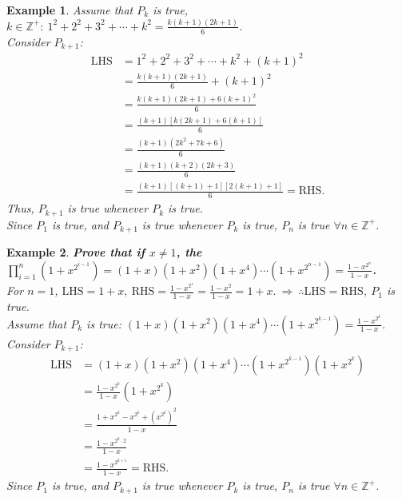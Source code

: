 \documentclass[12pt, a4paper]{article}
\newtheorem{example}{Example}[subsection]
\begin{document}
\begin{enumerate}
\begin{example}
    Assume that $P_k$ is true, $k \in \mathbb{Z}^+:\ 1^2+2^2+3^2+\cdots+k^2=\frac{k(k+1)(2k+1)}{6}$.\\
    Consider $P_{k+1}$: 
    $$\begin{aligned}
      \text{LHS}&=1^2+2^2+3^2+\cdots+k^2+(k+1)^2\\
      &=\frac{k(k+1)(2k+1)}{6}+(k+1)^2\\
      &=\frac{k(k+1)(2k+1)+6(k+1)^2}{6}\\
      &=\frac{(k+1)[k(2k+1)+6(k+1)]}{6}\\
      &=\frac{(k+1)(2k^2+7k+6)}{6}\\
      &=\frac{(k+1)(k+2)(2k+3)}{6}\\
      &=\frac{(k+1)[(k+1)+1][2(k+1)+1]}{6}=\text{RHS}.
    \end{aligned}$$
    Thus, $P_{k+1}$ is true whenever $P_k$ is true. \\
    Since $P_1$ is true, and $P_{k+1}$ is true whenever $P_k$ is true, $P_n$ is true $\forall n \in \mathbb{Z}^+$.
  \end{example}
  \begin{example}
    \textbf{Prove that if $x\neq 1$, the $\prod\limits_{i=1}^{n}(1+x^{2^{i-1}})=(1+x)(1+x^2)(1+x^4)\cdots (1+x^{2^{n-1}})=\frac{1-x^{2^n}}{1-x}$.}\\
    For $n=1$, $\text{LHS}=1+x,\ \text{RHS}=\frac{1-x^{2^1}}{1-x}=\frac{1-x^2}{1-x}=1+x.\ \Rightarrow\ \therefore \text{LHS}=\text{RHS},\ P_1$ is true. \\
    Assume that $P_k$ is true: $(1+x)(1+x^2)(1+x^4)\cdots (1+x^{2^{k-1}})=\frac{1-x^{2^k}}{1-x}$.\\
    Consider $P_{k+1}$: 
    $$\begin{aligned}
      \text{LHS}&=(1+x)(1+x^2)(1+x^4)\cdots (1+x^{2^{k-1}})(1+x^{2^{k}})\\
      &=\frac{1-x^{2^k}}{1-x}(1+x^{2^{k}})\\
      &=\frac{1+x^{2^k}-x^{2^k}+(x^{2^k})^2}{1-x}\\
      &=\frac{1-x^{2^k\cdot 2}}{1-x}\\
      &=\frac{1-x^{2^{k+1}}}{1-x}=\text{RHS}.
    \end{aligned}$$
    Since $P_1$ is true, and $P_{k+1}$ is true whenever $P_k$ is true, $P_n$ is true $\forall n \in\mathbb{Z}^+$.
  \end{example}
\end{enumerate}
\end{document}
